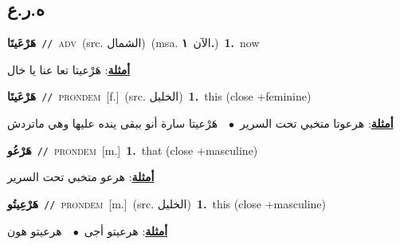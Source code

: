 \documentclass[10pt,a4paper,twoside]{article} %
\begin{document}
\begin{multicols}{2}
\vspace{-3mm}
\subsection*{\color{blue}\foreignlanguage{arabic}{ه.ر.ع}\color{blue}{}} 

{\setlength\topsep{0pt}\textbf{\foreignlanguage{arabic}{هَرْعَيتَا}}\ {\color{gray}\texttt{//}\color{black}}\ \textsc{adv}\ (src. \color{gray}\foreignlanguage{arabic}{الشمال}\color{black})\ \color{gray}(msa. \foreignlanguage{arabic}{الآن}~\foreignlanguage{arabic}{\textbf{١.}})\color{black}\ \textbf{1.}~now\  \begin{flushright}\color{gray}\foreignlanguage{arabic}{\textbf{\underline{\foreignlanguage{arabic}{أمثلة}}}: هَرْعيتا تعا عنا يا خال}\end{flushright}\color{black}} \vspace{2mm}

{\setlength\topsep{0pt}\textbf{\foreignlanguage{arabic}{هَرْعَيتَا}}\ {\color{gray}\texttt{//}\color{black}}\ \textsc{pron\textunderscore dem}\ [f.]\ (src. \color{gray}\foreignlanguage{arabic}{الخليل}\color{black})\ \textbf{1.}~this (close +feminine)\  \begin{flushright}\color{gray}\foreignlanguage{arabic}{\textbf{\underline{\foreignlanguage{arabic}{أمثلة}}}: هرعوتا متخبي تحت السرير\ $\bullet$\ \  هَرْعيتا سارة أنو ببقى ينده عليها وهي ماتردش}\end{flushright}\color{black}} \vspace{2mm}

{\setlength\topsep{0pt}\textbf{\foreignlanguage{arabic}{هَرْعُو}}\ {\color{gray}\texttt{//}\color{black}}\ \textsc{pron\textunderscore dem}\ [m.]\ \textbf{1.}~that (close +masculine)\  \begin{flushright}\color{gray}\foreignlanguage{arabic}{\textbf{\underline{\foreignlanguage{arabic}{أمثلة}}}: هرعو متخبي تحت السرير}\end{flushright}\color{black}} \vspace{2mm}

{\setlength\topsep{0pt}\textbf{\foreignlanguage{arabic}{هَرْعِيتُو}}\ {\color{gray}\texttt{//}\color{black}}\ \textsc{pron\textunderscore dem}\ [m.]\ (src. \color{gray}\foreignlanguage{arabic}{الخليل}\color{black})\ \textbf{1.}~this (close +masculine)\  \begin{flushright}\color{gray}\foreignlanguage{arabic}{\textbf{\underline{\foreignlanguage{arabic}{أمثلة}}}: هرعيتو أجى\ $\bullet$\ \  هرعيتو هون}\end{flushright}\color{black}} \vspace{2mm}


\end{multicols}
\end{document}
